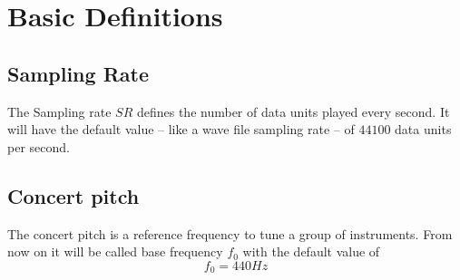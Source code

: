 \section{Basic Definitions}
	\subsection{Sampling Rate}
	The Sampling rate $ SR $ defines the number of data units played every second. It will have the default value -- like a wave file sampling rate -- of $ 44100 $ data units per second.

	\subsection{Concert pitch}
	The concert pitch is a reference frequency to tune a group of instruments. From now on it will be called base frequency $ f_0 $ with the default value of
	\begin{equation*}
		f_0=440Hz
	\end{equation*} 